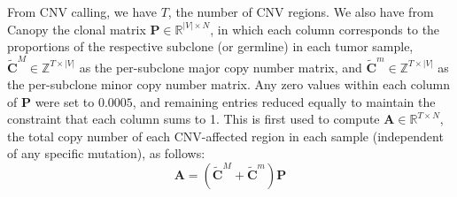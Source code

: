 From CNV calling, we have $T$, the number of CNV regions. We also have from Canopy the clonal matrix $\mathbf{P} \in \mathbb{R}^{|V| \times N}$, in which each column corresponds to the proportions of the respective subclone (or germline) in each tumor sample, $\tilde{\mathbf{C}}^M \in \mathbb{Z}^{T \times |V|}$ as the per-subclone major copy number matrix, and $\tilde{\mathbf{C}}^m \in \mathbb{Z}^{T \times |V|}$ as the per-subclone minor copy number matrix. Any zero values within each column of $\mathbf{P}$ were set to $0.0005$, and remaining entries reduced equally to maintain the constraint that each column sums to 1. This is first used to compute $\mathbf{A} \in \mathbb{R}^{T \times N}$, the total copy number of each CNV-affected region in each sample (independent of any specific mutation), as follows:
\begin{equation}
    \mathbf{A} = (\tilde{\mathbf{C}}^M + \tilde{\mathbf{C}}^m)\mathbf{P}
\end{equation}

